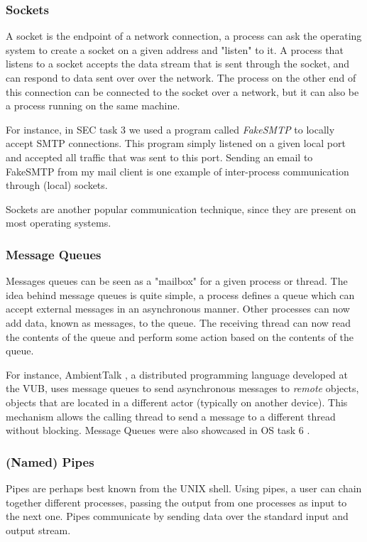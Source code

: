 \subsubsection{Sockets}
A socket is the endpoint of a network connection, a process can ask the operating system to create a socket on a given address and "listen" to it. A process that listens to a socket accepts the data stream that is sent through the socket, and can respond to data sent over over the network. The process on the other end of this connection can be connected to the socket over a network, but it can also be a process running on the same machine. 

For instance, in SEC task 3 \cite{task3} we used a program called \textit{FakeSMTP} to locally accept SMTP connections. This program simply listened on a given local port and accepted all traffic that was sent to this port. Sending an email to FakeSMTP from my mail client is one example of inter-process communication through (local) sockets. 

Sockets are another popular communication technique, since they are present on most operating systems.

\subsubsection{Message Queues}
Messages queues can be seen as a "mailbox" for a given process or thread. The idea behind message queues is quite simple, a process defines a queue which can accept external messages in an asynchronous manner. Other processes can now add data, known as messages, to the queue. The receiving thread can now read the contents of the queue and perform some action based on the contents of the queue.

For instance, AmbientTalk \cite{ambienttalk}, a distributed programming language developed at the VUB, uses message queues to send asynchronous messages to \textit{remote} objects, objects that are located in a different actor (typically on another device). This mechanism allows the calling thread to send a message to a different thread without blocking.
Message Queues were also showcased in OS task 6 \cite{task6}.


\subsubsection{(Named) Pipes}
Pipes are perhaps best known from the UNIX shell. Using pipes, a user can chain together different processes, passing the output from one processes as input to the next one. Pipes communicate by sending data over the standard input and output stream. 

